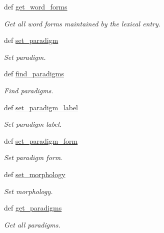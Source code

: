 \begin{DoxyCompactItemize}
def \hyperlink{classlmf_1_1src_1_1core_1_1lexical__entry_1_1_lexical_entry_a78f21adcc19aca799e18e7ae89588e83}{get\+\_\+word\+\_\+forms}
\begin{DoxyCompactList}\small\item\em Get all word forms maintained by the lexical entry. \end{DoxyCompactList}\item 
def \hyperlink{classlmf_1_1src_1_1core_1_1lexical__entry_1_1_lexical_entry_a5183e8be3b27dd7ff7f8ad2bc100c289}{set\+\_\+paradigm}
\begin{DoxyCompactList}\small\item\em Set paradigm. \end{DoxyCompactList}\item 
def \hyperlink{classlmf_1_1src_1_1core_1_1lexical__entry_1_1_lexical_entry_a4d29b1f69f6591832869bdfdbed1dc90}{find\+\_\+paradigms}
\begin{DoxyCompactList}\small\item\em Find paradigms. \end{DoxyCompactList}\item 
def \hyperlink{classlmf_1_1src_1_1core_1_1lexical__entry_1_1_lexical_entry_af2b23a5d39e9bddddf4da1a971d6928c}{set\+\_\+paradigm\+\_\+label}
\begin{DoxyCompactList}\small\item\em Set paradigm label. \end{DoxyCompactList}\item 
def \hyperlink{classlmf_1_1src_1_1core_1_1lexical__entry_1_1_lexical_entry_ad991d3a24dea50c4d793b3c947fa9037}{set\+\_\+paradigm\+\_\+form}
\begin{DoxyCompactList}\small\item\em Set paradigm form. \end{DoxyCompactList}\item 
def \hyperlink{classlmf_1_1src_1_1core_1_1lexical__entry_1_1_lexical_entry_ac4b0c5f22daeba6c9cb445e80c8245e4}{set\+\_\+morphology}
\begin{DoxyCompactList}\small\item\em Set morphology. \end{DoxyCompactList}\item 
def \hyperlink{classlmf_1_1src_1_1core_1_1lexical__entry_1_1_lexical_entry_ae87d1a773737190fba2a22330b886472}{get\+\_\+paradigms}
\begin{DoxyCompactList}\small\item\em Get all paradigms. \end{DoxyCompactList}\item 

\end{DoxyCompactItemize}
